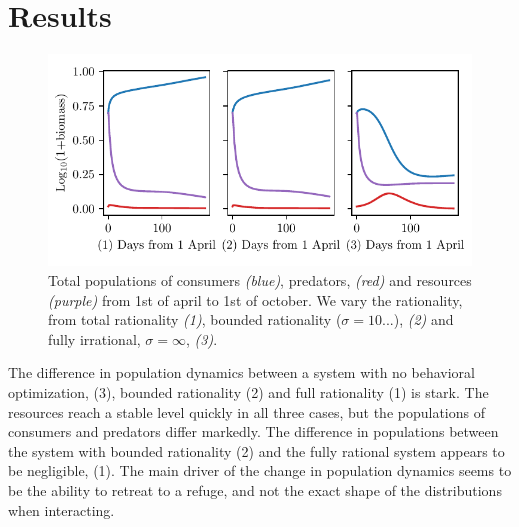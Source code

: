 \section{Results}


\begin{figure}[H]
\includegraphics{plots/populations.pdf}
\caption{Total populations of consumers \emph{(blue)}, predators, \emph{(red)} and resources \emph{(purple)} from 1st of april to 1st of october. We vary the rationality, from total rationality \emph{(1)}, bounded rationality ($\sigma = 10...$), \emph{(2)} and fully irrational, $\sigma = \infty$, \emph{(3)}.}
\label{fig:long_term_populations}
\end{figure}
The difference in population dynamics between a system with no behavioral optimization, (3), bounded rationality (2) and full rationality (1) is stark. The resources reach a stable level quickly in all three cases, but the populations of consumers and predators differ markedly. The difference in populations between the system with bounded rationality (2) and the fully rational system appears to be negligible, (1). The main driver of the change in population dynamics seems to be the ability to retreat to a refuge, and not the exact shape of the distributions when interacting. 
